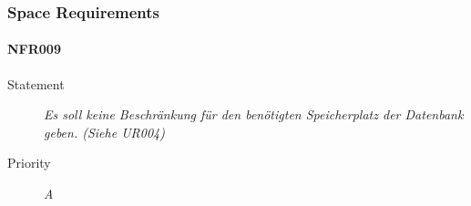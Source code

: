 \subsubsection{Space Requirements}

\paragraph{NFR009}
\begin{description}
\item[Statement] \textit{Es soll keine Beschränkung für den benötigten Speicherplatz der Datenbank geben.
(Siehe UR004)}
\item[Priority] \textit{A}
\end{description}
